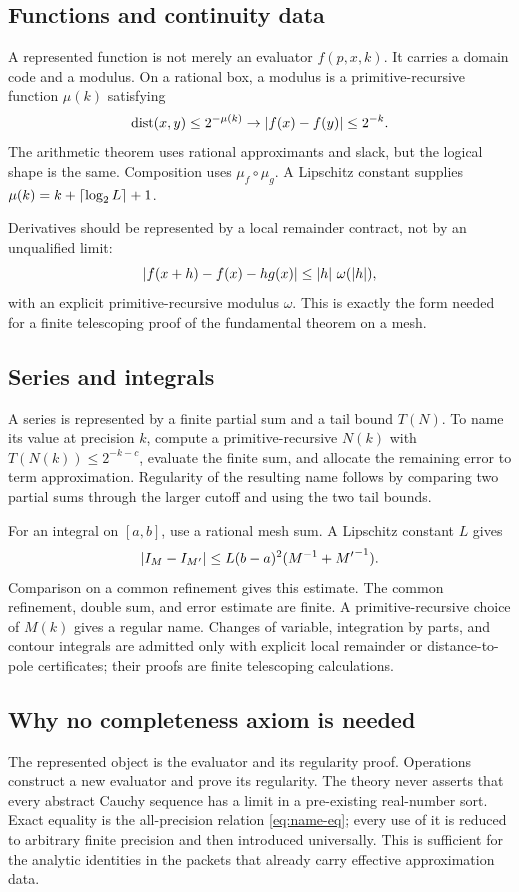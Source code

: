 \subsection{Functions and continuity data}

A represented function is not merely an evaluator \(f(p,x,k)\).  It carries a
domain code and a modulus.  On a rational box, a modulus is a
primitive-recursive function \(\mu(k)\) satisfying
\[
 \operatorname{dist}(x,y)\le2^{-\mu(k)}\to
 \left|f(x)-f(y)\right|\le2^{-k}.
\]
The arithmetic theorem uses rational approximants and slack, but the logical
shape is the same.  Composition uses \(\mu_f\circ\mu_g\).  A Lipschitz
constant supplies \(\mu(k)=k+\left\lceil\log_2 L\right\rceil+1\).

Derivatives should be represented by a local remainder contract, not by an
unqualified limit:
\[
 \left|f(x+h)-f(x)-h g(x)\right|\le \left|h\right|\,\omega(\left|h\right|),
\]
with an explicit primitive-recursive modulus \(\omega\).  This is exactly the
form needed for a finite telescoping proof of the fundamental theorem on a
mesh.

\subsection{Series and integrals}

A series is represented by a finite partial sum and a tail bound
\(T(N)\).  To name its value at precision \(k\), compute a
primitive-recursive \(N(k)\) with \(T(N(k))\le2^{-k-c}\), evaluate the finite
sum, and allocate the remaining error to term approximation.  Regularity of
the resulting name follows by comparing two partial sums through the larger
cutoff and using the two tail bounds.

For an integral on \([a,b]\), use a rational mesh sum.  A Lipschitz constant
\(L\) gives
\[
 \left|I_M-I_{M'}\right|\le L(b-a)^2(M^{-1}+{M'}^{-1}).
\]
Comparison on a common refinement gives this estimate.  The common refinement, double sum,
and error estimate are finite.  A primitive-recursive choice of \(M(k)\)
gives a regular name.  Changes of variable, integration by parts, and contour
integrals are admitted only with explicit local remainder or distance-to-pole
certificates; their proofs are finite telescoping calculations.

\subsection{Why no completeness axiom is needed}

The represented object is the evaluator and its regularity proof.  Operations
construct a new evaluator and prove its regularity.  The theory never asserts
that every abstract Cauchy sequence has a limit in a pre-existing real-number
sort.  Exact equality is the all-precision relation \eqref{eq:name-eq}; every
use of it is reduced to arbitrary finite precision and then introduced
universally.  This is sufficient for the analytic identities in the packets
that already carry effective approximation data.
